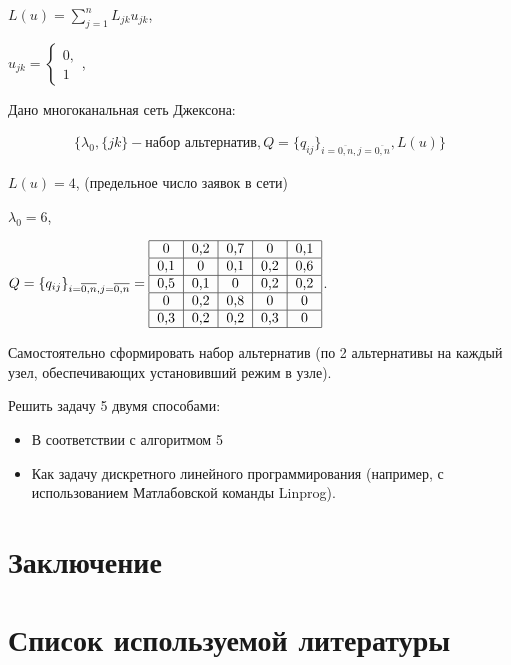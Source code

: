 \documentclass[a4paper, 12pt]{article}		%
\begin{document}
$ L(u) = \sum\limits_{j=1}^n L_{jk} u_{jk}$,

$ u_{jk} =
  \begin{cases}
    0,\\
    1
 \end{cases}$,
 
Дано многоканальная сеть Джексона:

\begin{gather*}
\{ \lambda_0, \{jk\} - \text{набор альтернатив}, Q=\{q_{ij}\}_{i=\overline{0,n}, j=\overline{0,n}}, L(u) \}
\end{gather*} 

$L(u) = 4$, (предельное число заявок в сети)

$\lambda_0 = 6$,

$Q=\{q_{ij}\}_{i=\overline{0,n}, j=\overline{0,n}} = \begin{tabular}{|c|c|c|c|c|}
\hline 
0 & 0,2 & 0,7 & 0 & 0,1 \\ 
\hline 
0,1 & 0 & 0,1 & 0,2 & 0,6 \\ 
\hline 
0,5 & 0,1 & 0 & 0,2 & 0,2 \\ 
\hline 
0 & 0,2 & 0,8 & 0 & 0 \\ 
\hline 
0,3 & 0,2 & 0,2 & 0,3 & 0 \\ 
\hline 
\end{tabular} $.

Самостоятельно сформировать набор альтернатив (по 2 альтернативы на каждый узел, обеспечивающих установивший режим в узле).

Решить задачу 5 двумя способами:

\begin{itemize}
\item В соответствии с алгоритмом 5
\item Как задачу дискретного линейного программирования (например, с использованием Матлабовской команды Linprog).
\end{itemize}


%
\newpage
\section*{Заключение}


%
\newpage
\section*{Список используемой литературы}
\end{document}
